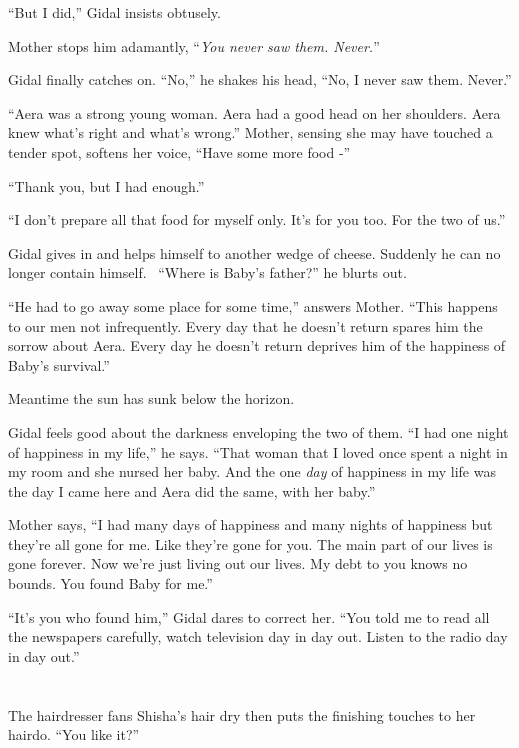 \documentclass[twoside,11pt]{book}
\begin{document}
``But I did,'' Gidal insists obtusely.

Mother stops him adamantly, ``\textit{You never saw them. Never.}''

Gidal finally catches on. ``No,'' he shakes his head, ``No, I never saw them. Never.''

``Aera was a strong young woman. Aera had a good head on her shoulders. Aera knew what's right and what's
wrong.'' Mother, sensing she may have touched a tender spot, softens her voice, ``Have some
more food -''

``Thank you, but I had enough.''

``I don't prepare all that food for myself only. It's for you too. For the two of us.''

Gidal gives in and helps himself to another wedge of cheese. Suddenly he can no longer contain himself.
\ ``Where is Baby's father?'' he blurts out.

``He had to go away some place for some time,'' answers Mother. ``This happens to
our men not infrequently. Every day that he doesn't return spares him the sorrow about Aera. Every day he doesn't
return deprives him of the happiness of Baby's survival.''

Meantime the sun has sunk below the horizon.

Gidal feels good about the darkness enveloping the two of them. ``I had one night of happiness in my
life,'' he says. ``That woman that I loved once spent a night in my room and she nursed her
baby. And the{ }one \textit{day }of happiness in my life was the day I came
here and Aera did the same, with her baby.''

Mother says, ``I had many days of happiness and many nights of happiness but they're all gone for me. Like
they're gone for you. The main part of our lives is gone forever. Now we're just living out our lives. My debt to you
knows no bounds. You found Baby for me.''

``It's you who found him,'' Gidal dares to correct her. ``You told me to read all
the newspapers carefully, watch television day in day out. Listen to the radio{ }day in day
out.''



\chapter{}

The hairdresser fans Shisha's hair dry then puts the finishing touches to her hairdo. ``You like it?''
\end{document}
